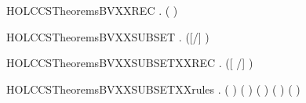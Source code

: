 \newcommand{\HOLCCSTheoremsBNXXind}{\UseVerbatim{HOLCCSTheoremsBNXXind}}
\begin{SaveVerbatim}{HOLCCSTheoremsBVXXREC}
\HOLTokenTurnstile{} \HOLSymConst{\HOLTokenForall{}} .  \HOLConst{\HOLTokenIn{}}  (  )
\end{SaveVerbatim}
\newcommand{\HOLCCSTheoremsBVXXREC}{\UseVerbatim{HOLCCSTheoremsBVXXREC}}
\begin{SaveVerbatim}{HOLCCSTheoremsBVXXSUBSET}
\HOLTokenTurnstile{} \HOLSymConst{\HOLTokenForall{}}  .  ([/] ) \HOLConst{\HOLTokenSubset{}}   \HOLConst{\HOLTokenUnion{}}  
\end{SaveVerbatim}
\newcommand{\HOLCCSTheoremsBVXXSUBSET}{\UseVerbatim{HOLCCSTheoremsBVXXSUBSET}}
\begin{SaveVerbatim}{HOLCCSTheoremsBVXXSUBSETXXREC}
\HOLTokenTurnstile{} \HOLSymConst{\HOLTokenForall{}} .  ([  /] ) \HOLConst{\HOLTokenSubset{}}    
\end{SaveVerbatim}
\newcommand{\HOLCCSTheoremsBVXXSUBSETXXREC}{\UseVerbatim{HOLCCSTheoremsBVXXSUBSETXXREC}}
\begin{SaveVerbatim}{HOLCCSTheoremsBVXXSUBSETXXrules}
\HOLTokenTurnstile{} \HOLSymConst{\HOLTokenForall{}}  .
         \HOLConst{\HOLTokenSubset{}}  (  ) \HOLSymConst{\HOLTokenConj{}}   \HOLConst{\HOLTokenSubset{}}  ( \HOLSymConst{\ensuremath{+}} ) \HOLSymConst{\HOLTokenConj{}}
         \HOLConst{\HOLTokenSubset{}}  ( \HOLSymConst{\ensuremath{+}} ) \HOLSymConst{\HOLTokenConj{}}   \HOLConst{\HOLTokenSubset{}}  ( \HOLSymConst{\ensuremath{\parallel}} ) \HOLSymConst{\HOLTokenConj{}}
         \HOLConst{\HOLTokenSubset{}}  ( \HOLSymConst{\ensuremath{\parallel}} )
\end{SaveVerbatim}
